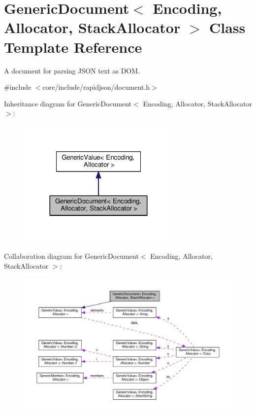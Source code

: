 \hypertarget{classGenericDocument}{}\section{Generic\+Document$<$ Encoding, Allocator, Stack\+Allocator $>$ Class Template Reference}
\label{classGenericDocument}


A document for parsing J\+S\+ON text as D\+OM.  




{\ttfamily \#include $<$core/include/rapidjson/document.\+h$>$}



Inheritance diagram for Generic\+Document$<$ Encoding, Allocator, Stack\+Allocator $>$\+:
\nopagebreak
\begin{figure}[H]
\begin{center}
\leavevmode
\includegraphics[width=228pt]{classGenericDocument__inherit__graph}
\end{center}
\end{figure}


Collaboration diagram for Generic\+Document$<$ Encoding, Allocator, Stack\+Allocator $>$\+:
\nopagebreak
\begin{figure}[H]
\begin{center}
\leavevmode
\includegraphics[width=350pt]{classGenericDocument__coll__graph}
\end{center}
\end{figure}
